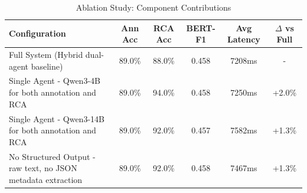 \begin{table}[h]
\centering
\caption{Ablation Study: Component Contributions}
\label{tab:ablation}
\begin{tabular}{lccccc}
\toprule
\textbf{Configuration} & \textbf{Ann Acc} & \textbf{RCA Acc} & \textbf{BERT-F1} & \textbf{Avg Latency} & \textbf{$\Delta$ vs Full} \\
\midrule
Full System (Hybrid dual-agent baseline) & 89.0\% & 88.0\% & 0.458 & 7208ms & - \\
Single Agent - Qwen3-4B for both annotation and RCA & 89.0\% & 94.0\% & 0.458 & 7250ms & +2.0\% \\
Single Agent - Qwen3-14B for both annotation and RCA & 89.0\% & 92.0\% & 0.457 & 7582ms & +1.3\% \\
No Structured Output - raw text, no JSON metadata extraction & 89.0\% & 92.0\% & 0.458 & 7467ms & +1.3\% \\
\bottomrule
\end{tabular}
\end{table}
